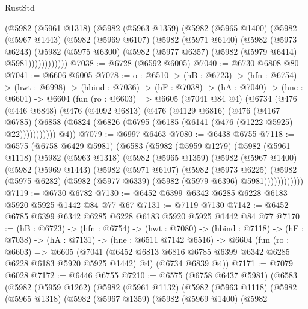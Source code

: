 \begin{lexlean}{RustStd}
\begin{coremodule}
        (@5982
          (@5961 @1318)
          (@5982
            (@5963 @1359)
            (@5982
              (@5965 @1400)
              (@5982
                (@5967 @1443)
                (@5982
                  (@5969 @6107)
                  (@5982
                    (@5971 @6140)
                    (@5982
                      (@5973 @6243)
                      (@5982
                        (@5975 @6300)
                        (@5982 (@5977 @6357) (@5982 (@5979 @6414) @5981))))))))))))
@7038 := @6728 (@6592 @6005)
@7040 := @6730 @6808 @80
@7041 := @6606 @6005
@7078 := {o : @6510} ->
  (hB : @6723) ->
  (hfn : @6754) ->
  (hwt : @6998) ->
  (hbind : @7036) ->
  (hF : @7038) ->
  (hA : @7040) ->
  (hne : @6601) ->
  @6604
    (fun (ro : @6603) =>
    @6605
      (@7041 @84 @4)
      (@6734
        (@476
          (@446 @6848)
          (@476
            (@4092 @6813)
            (@476
              (@4129 @6816)
              (@476
                (@4167 @6785)
                (@6858 (@6824 (@6826 (@6795 (@6185 (@6141 (@476 (@1222 @5925) @22)))))))))))
        @4))
@7079 := @6997 @6463
@7080 := @6438 @6755
@7118 := @6575
    (@6758 @6429 @5981)
    (@6583
      (@5982
        (@5959 @1279)
        (@5982
          (@5961 @1118)
          (@5982
            (@5963 @1318)
            (@5982
              (@5965 @1359)
              (@5982
                (@5967 @1400)
                (@5982
                  (@5969 @1443)
                  (@5982
                    (@5971 @6107)
                    (@5982
                      (@5973 @6225)
                      (@5982
                        (@5975 @6282)
                        (@5982 (@5977 @6339) (@5982 (@5979 @6396) @5981))))))))))))
@7119 := @6730 @6782
@7130 := @6452 @6399 @6342 @6285 @6228 @6183 @5920 @5925 @1442 @84 @77 @67
@7131 := @7119 @7130
@7142 := @6452 @6785 @6399 @6342 @6285 @6228 @6183 @5920 @5925 @1442 @84 @77
@7170 := (hB : @6723) ->
  (hfn : @6754) ->
  (hwt : @7080) ->
  (hbind : @7118) ->
  (hF : @7038) ->
  (hA : @7131) ->
  (hne : @6511 @7142 @6516) ->
  @6604
    (fun (ro : @6603) =>
    @6605
      (@7041 (@6452 @6813 @6816 @6785 @6399 @6342 @6285 @6228 @6183 @5920 @5925 @1442) @4)
      (@6734 @6839 @4))
@7171 := @7079 @6028
@7172 := @6446 @6755
@7210 := @6575
    (@6758 @6437 @5981)
    (@6583
      (@5982
        (@5959 @1262)
        (@5982
          (@5961 @1132)
          (@5982
            (@5963 @1118)
            (@5982
              (@5965 @1318)
              (@5982
                (@5967 @1359)
                (@5982
                  (@5969 @1400)
                  (@5982

\end{coremodule}
\end{lexlean}
